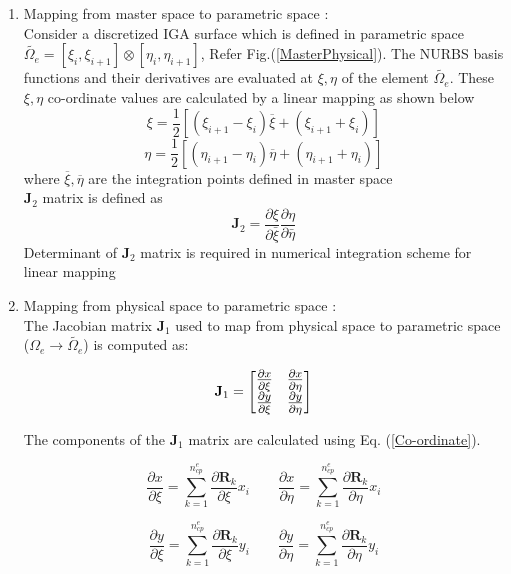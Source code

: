 \documentclass[11pt]{article}
\begin{document}
\begin{enumerate}[leftmargin=*]
	\item Mapping from master space to parametric space \cite{agrawal2019iga}: \\
	Consider a discretized IGA surface which is defined in parametric space
	$\widetilde{\Omega_e}=[\xi_i,\xi_{i+1}]\otimes[\eta_i,\eta_{i+1}]$, Refer
	Fig.(\ref{MasterPhysical}). The NURBS basis functions and their derivatives are evaluated at
	$\xi,\eta$ of the element $\widetilde{\Omega_e}$. These $\xi,\eta$ co-ordinate
	values are calculated by a linear mapping as shown below
	\begin{equation}
	\xi=\frac{1}{2}[(\xi_{i+1}-\xi_{i})\overline{\xi}+(\xi_{i+1}+\xi_{i})]
	\end{equation} 
	\begin{equation}
	\eta=\frac{1}{2}[(\eta_{i+1}-\eta_{i})\overline{\eta}+(\eta_{i+1}+\eta_{i})]
	\end{equation}
	where $\overline{\xi},\overline{\eta}$ are the integration points defined in
	master space \\
	$\textbf{J}_2$ matrix is defined as 
	\begin{equation}
	\textbf{J}_2 = \frac{\partial\xi}{\partial \bar{\xi}}
	\frac{\partial\eta}{\partial \bar{\eta}}
	\end{equation} 
	Determinant of $\textbf{J}_2$ matrix is required in numerical integration
	scheme for linear mapping 
	
	
	\item Mapping from physical space to parametric space \cite{agrawal2019iga}: \\
	The Jacobian matrix $\textbf{J}_1$ used to map from physical space to
	parametric space ($\Omega_e \rightarrow \widetilde{\Omega_e}$) is computed as:
	
	\begin{equation} \label{J1Matrix1}
	\textbf{J}_1 =
	\large
	\begin{bmatrix}
	\frac{\partial x}{\partial \xi} &\frac{\partial x}{\partial \eta} \\
	\frac{\partial y}{\partial \xi} &\frac{\partial y}{\partial \eta} \\
	\end{bmatrix} 
	\end{equation}
	
	The components of the $\textbf{J}_1$ matrix are calculated using Eq.
	(\ref{Co-ordinate}).
	
	\begin{equation}
	\frac{\partial x}{\partial \xi} = \sum_{k=1}^{n_{cp}^e} \frac{\partial
		\textbf{R}_k}{\partial \xi} x_i
	\qquad
	\frac{\partial x}{\partial \eta} = \sum_{k=1}^{n_{cp}^e} \frac{\partial
		\textbf{R}_k}{\partial \eta} x_i
	\end{equation} 
	
	\begin{equation}
	\frac{\partial y}{\partial \xi} = \sum_{k=1}^{n_{cp}^e} \frac{\partial
		\textbf{R}_k}{\partial \xi} y_i
	\qquad
	\frac{\partial y}{\partial \eta} = \sum_{k=1}^{n_{cp}^e} \frac{\partial
		\textbf{R}_k}{\partial \eta} y_i
	\end{equation}
	
\end{enumerate}
\end{document}
